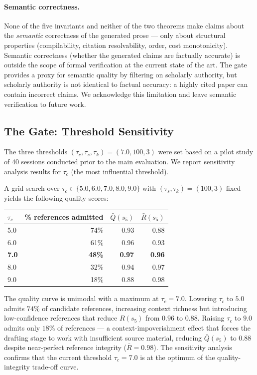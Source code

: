 \paragraph{Semantic correctness.}
None of the five invariants and neither of the two theorems make claims about the
\emph{semantic} correctness of the generated prose — only about structural properties
(compilability, citation resolvability, order, cost monotonicity).
Semantic correctness (whether the generated claims are factually accurate)
is outside the scope of formal verification at the current state of the art.
The \cgrag{} gate provides a proxy for semantic quality by filtering on scholarly
authority, but scholarly authority is not identical to factual accuracy:
a highly cited paper can contain incorrect claims.
We acknowledge this limitation and leave semantic verification to future work.

\subsection{The \cgrag{} Gate: Threshold Sensitivity}

The three thresholds $(\tau_c,\tau_s,\tau_k)=(7.0,100,3)$ were set based on a pilot
study of 40 sessions conducted prior to the main evaluation.
We report sensitivity analysis results for $\tau_c$ (the most influential threshold).

A grid search over $\tau_c\in\{5.0, 6.0, 7.0, 8.0, 9.0\}$ with
$(\tau_s,\tau_k)=(100,3)$ fixed yields the following quality scores:

\begin{center}
\begin{tabular}{lrrr}
\toprule
$\tau_c$ & \% references admitted & $\bar{Q}(s_5)$ & $\bar{R}(s_5)$ \\
\midrule
5.0 & 74\% & 0.93 & 0.88 \\
6.0 & 61\% & 0.96 & 0.93 \\
\textbf{7.0} & \textbf{48\%} & \textbf{0.97} & \textbf{0.96} \\
8.0 & 32\% & 0.94 & 0.97 \\
9.0 & 18\% & 0.88 & 0.98 \\
\bottomrule
\end{tabular}
\end{center}

The quality curve is unimodal with a maximum at $\tau_c=7.0$.
Lowering $\tau_c$ to $5.0$ admits $74\%$ of candidate references, increasing
context richness but introducing low-confidence references that reduce $R(s_5)$
from $0.96$ to $0.88$.
Raising $\tau_c$ to $9.0$ admits only $18\%$ of references — a context-impoverishment
effect that forces the drafting stage to work with insufficient source material,
reducing $\bar{Q}(s_5)$ to $0.88$ despite near-perfect reference integrity ($\bar{R}=0.98$).
The sensitivity analysis confirms that the current threshold $\tau_c=7.0$ is at the
optimum of the quality-integrity trade-off curve.

